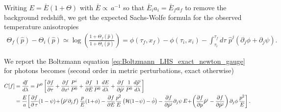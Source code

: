 Writing $E = \bar{E}(1+\Theta)$ with $\bar{E}\propto \, a^{-1}$ so that $\bar{E}_ia_i=\bar{E}_fa_f$ to remove the background redshift, we get the expected Sachs-Wolfe formula for the observed temperature anisotropies
{\small
\begin{align}
    \Theta_f(\hat{p})-\Theta_i(\hat{p})\simeq \log\left(\frac{1+\Theta_f(\hat{p})}{1+\Theta_i(\hat{p})}\right) 
    = \phi(\tau_f,x_f)-\phi(\tau_i,x_i) - \int_{\tau_i}^{\tau_f} d\tau\,\, \hat{p}^j(\partial_j\phi+\partial_j\psi).
\end{align}}


We report the Boltzmann equation \eqref{eq:Boltzmann_LHS_exact_newton_gauge} for photons becomes (second order in metric perturbations, exact otherwise)
{\small
\begin{align}\label{eq:Boltzmann_LHS_exact_newton_gauge_photon}
\begin{aligned}
    C[f]&=\frac{d f}{d \lambda}
    =
    P^{0}\left[\frac{\partial f}{\partial \tau}+\frac{\partial f}{\partial x^{i}} \frac{P^{i}}{P^{0}}+\frac{\partial f}{\partial E} \frac{1}{P^{0}} \frac{d E}{d \lambda}+\frac{\partial f}{\partial \hat{p}^{i}} \frac{1}{P^{0}} \frac{d \hat{p}^{i}}{d \lambda}\right]
    \\
    &=\frac{E}{a}\!\left[\frac{\partial f}{\partial \ct}(1-\psi)
    \!+\!\left(\hat{p}^j\partial_jf\right) \frac{p}{E}(1\!+\!\phi)
    -\frac{\partial f}{\partial E}\frac{p^2}{E}\left(\mathcal{H}(1\!-\!\psi)-\dot\phi\right)
    -\frac{\partial f}{\partial \bar{p}^j}\partial_j\psi \,E
    \!+\!\left(\frac{\partial f}{\partial p} \hat{p}^j-\frac{\partial f}{\partial \bar{p}^j}\right)\partial_j\phi\,\frac{p^2}{E}\right].
\end{aligned}
\end{align}}

